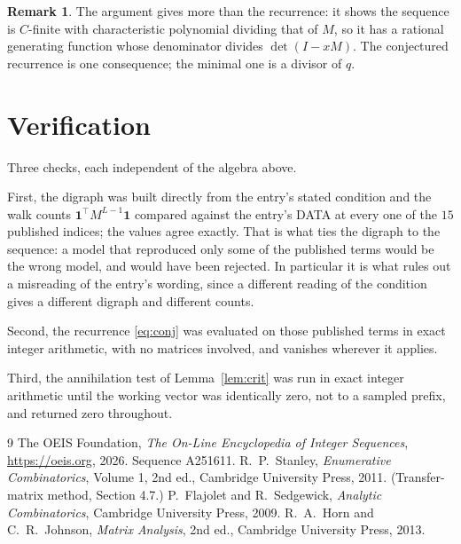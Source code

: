 \documentclass[11pt,a4paper]{article}
\theoremstyle{plain}
\theoremstyle{definition}
\newtheorem{remark}[theorem]{Remark}
\begin{document}
\begin{remark}
The argument gives more than the recurrence: it shows the sequence is $C$-finite with
characteristic polynomial dividing that of $M$, so it has a rational generating function
whose denominator divides $\det(I-xM)$. The conjectured recurrence is one consequence; the
minimal one is a divisor of $q$.
\end{remark}

\section{Verification}

Three checks, each independent of the algebra above.

First, the digraph was built directly from the entry's stated condition and the walk counts
$\mathbf{1}^{\!\top}M^{L-1}\mathbf{1}$ compared against the entry's DATA at
every one of the $15$ published indices; the values agree exactly. That is what ties
the digraph to the sequence: a model that reproduced only some of the published terms would
be the wrong model, and would have been rejected. In particular it is what rules out a
misreading of the entry's wording, since a different reading of the condition gives a
different digraph and different counts.

Second, the recurrence \eqref{eq:conj} was evaluated on those published terms in exact
integer arithmetic, with no matrices involved, and vanishes wherever it applies.

Third, the annihilation test of Lemma~\ref{lem:crit} was run in exact integer arithmetic
until the working vector was identically zero, not to a sampled prefix, and returned zero
throughout.

\begin{thebibliography}{9}
 The OEIS Foundation, \emph{The On-Line Encyclopedia of Integer
Sequences}, \url{https://oeis.org}, 2026. Sequence A251611.
 R.~P.~Stanley, \emph{Enumerative Combinatorics}, Volume 1, 2nd ed.,
Cambridge University Press, 2011. (Transfer-matrix method, Section 4.7.)
 P.~Flajolet and R.~Sedgewick, \emph{Analytic Combinatorics}, Cambridge
University Press, 2009.
 R.~A.~Horn and C.~R.~Johnson, \emph{Matrix Analysis}, 2nd ed., Cambridge
University Press, 2013.
\end{thebibliography}
\end{document}
